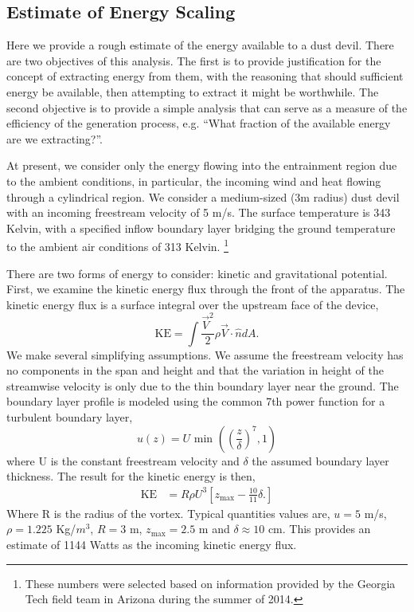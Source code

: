 \subsection{Estimate of Energy Scaling}

Here we provide a rough estimate of the energy
available to a dust devil. There are two objectives of this
analysis. The first is to provide justification for the concept of
extracting energy from them, with the reasoning that should
sufficient energy be available, then attempting to extract it might be
worthwhile. The second objective is to provide a simple analysis that
can serve as a measure of the efficiency of the generation process,
e.g. ``What fraction of the available energy are we extracting?''.  

At present, we consider only the energy flowing into the entrainment
region due to the ambient conditions, in particular, the incoming wind
and heat flowing through a cylindrical region. We
consider a medium-sized (3m radius) dust devil with an incoming
freestream velocity of 5 m/s. The surface temperature is 343 Kelvin,
with a specified inflow boundary layer bridging the ground temperature
to the ambient air conditions of 313 Kelvin. 
\footnote{\normalsize These numbers were selected based on information
provided by the Georgia Tech field team in Arizona during the summer of
2014.} 

There are two forms of energy to consider: kinetic and gravitational
potential. First, we examine the kinetic energy flux through the front
of the apparatus. 
The kinetic energy flux is a surface integral over the upstream face of
the device,  
\begin{equation*}
\text{KE} = \int \frac{\vec V^2}{2} \rho \vec V \cdot \hat n dA.
\end{equation*}
%
%
We make several simplifying assumptions. We assume the freestream 
velocity has no components in the span and height and
that the variation in height of the streamwise
velocity is only due to the thin boundary layer near the
ground. The boundary layer profile is modeled using the common 7th
power function for a turbulent boundary layer,  
\begin{equation*}
  u(z) = U \text{ min }\left(\left(\frac{z}{\delta}\right)^7,1\right)
\end{equation*}
where U is the constant freestream velocity and $\delta$ the assumed
boundary layer thickness. 
The result for the kinetic energy is then, 
\begin{align*}
\text{KE} & = R \rho U^3 \left[ z_{\text{max}} - \frac{10}{11}\delta.
\right]
\end{align*}
Where R is the radius of the vortex. Typical quantities values are, $u = 5$ m/s, $\rho =
1.225$ Kg/$m^3$, $R = 3$ m, $z_{\text{max}} = 2.5$ m and $\delta \approx
10$ cm. This provides an estimate of 1144 Watts as the incoming kinetic
energy flux. 

